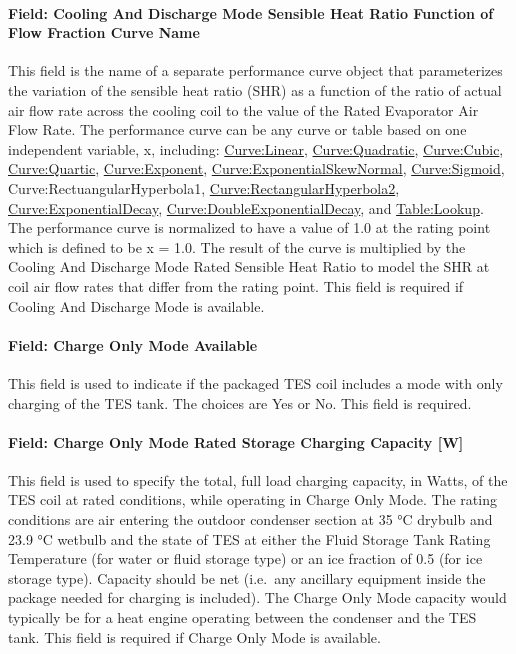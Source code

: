 \paragraph{Field: Cooling And Discharge Mode Sensible Heat Ratio Function of Flow Fraction Curve Name}\label{field-cooling-and-discharge-mode-sensible-heat-ratio-function-of-flow-fraction-curve-name}

This field is the name of a separate performance curve object that parameterizes the variation of the sensible heat ratio (SHR) as a function of the ratio of actual air flow rate across the cooling coil to the value of the Rated Evaporator Air Flow Rate. The performance curve can be any curve or table based on one independent variable, x, including: \hyperref[curvelinear]{Curve:Linear}, \hyperref[curvequadratic]{Curve:Quadratic}, \hyperref[curvecubic]{Curve:Cubic}, \hyperref[curvequartic]{Curve:Quartic}, \hyperref[curveexponent]{Curve:Exponent}, \hyperref[curveexponentialskewnormal]{Curve:ExponentialSkewNormal}, \hyperref[curvesigmoid]{Curve:Sigmoid}, Curve:RectuangularHyperbola1, \hyperref[curverectangularhyperbola2]{Curve:RectangularHyperbola2}, \hyperref[curveexponentialdecay]{Curve:ExponentialDecay}, \hyperref[curvedoubleexponentialdecay]{Curve:DoubleExponentialDecay}, and \hyperref[tablelookup]{Table:Lookup}. The performance curve is normalized to have a value of 1.0 at the rating point which is defined to be x = 1.0. The result of the curve is multiplied by the Cooling And Discharge Mode Rated Sensible Heat Ratio to model the SHR at coil air flow rates that differ from the rating point. This field is required if Cooling And Discharge Mode is available.

\paragraph{Field: Charge Only Mode Available}\label{field-charge-only-mode-available}

This field is used to indicate if the packaged TES coil includes a mode with only charging of the TES tank. The choices are Yes or No. This field is required.

\paragraph{Field: Charge Only Mode Rated Storage Charging Capacity {[}W{]}}\label{field-charge-only-mode-rated-storage-charging-capacity-w}

This field is used to specify the total, full load charging capacity, in Watts, of the TES coil at rated conditions, while operating in Charge Only Mode. The rating conditions are air entering the outdoor condenser section at 35 °C drybulb and 23.9 °C wetbulb and the state of TES at either the Fluid Storage Tank Rating Temperature (for water or fluid storage type) or an ice fraction of 0.5 (for ice storage type). Capacity should be net (i.e.~any ancillary equipment inside the package needed for charging is included). The Charge Only Mode capacity would typically be for a heat engine operating between the condenser and the TES tank. This field is required if Charge Only Mode is available.

